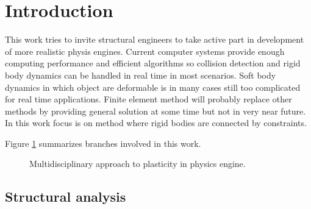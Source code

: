 \section{Introduction}

This work tries to invite structural engineers to take active part in development of more realistic physis engines.
Current computer systems provide enough computing performance and efficient algorithms so collision detection and 
rigid body dynamics can be handled in real time in most scenarios.
Soft body dynamics in which  object are deformable is in many cases still too complicated for real time applications.
Finite element method will probably replace other methods by providing general solution at some time but not in very near future.
In this work focus is on method where rigid bodies are connected by constraints.



Figure \ref{fig:areas} summarizes branches involved in this work.

\begin{figure}[htb!]
\centering
{}
\caption{Multidisciplinary approach to plasticity in physics engine.}
\label{fig:areas}
\end{figure}

\subsection{Structural analysis}

